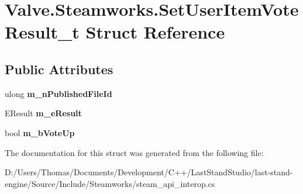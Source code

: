 \hypertarget{structValve_1_1Steamworks_1_1SetUserItemVoteResult__t}{}\section{Valve.\+Steamworks.\+Set\+User\+Item\+Vote\+Result\+\_\+t Struct Reference}
\label{structValve_1_1Steamworks_1_1SetUserItemVoteResult__t}
\subsection*{Public Attributes}
\begin{DoxyCompactItemize}
\item 
\hypertarget{structValve_1_1Steamworks_1_1SetUserItemVoteResult__t_a5e2d6cc1134bfa8d3d8f0e116e18c647}{}ulong {\bfseries m\+\_\+n\+Published\+File\+Id}\label{structValve_1_1Steamworks_1_1SetUserItemVoteResult__t_a5e2d6cc1134bfa8d3d8f0e116e18c647}

\item 
\hypertarget{structValve_1_1Steamworks_1_1SetUserItemVoteResult__t_abad4b985896aa459650985c16fc6e6d3}{}E\+Result {\bfseries m\+\_\+e\+Result}\label{structValve_1_1Steamworks_1_1SetUserItemVoteResult__t_abad4b985896aa459650985c16fc6e6d3}

\item 
\hypertarget{structValve_1_1Steamworks_1_1SetUserItemVoteResult__t_a29b73c2b809d3d37b21963f949f8f21a}{}bool {\bfseries m\+\_\+b\+Vote\+Up}\label{structValve_1_1Steamworks_1_1SetUserItemVoteResult__t_a29b73c2b809d3d37b21963f949f8f21a}

\end{DoxyCompactItemize}


The documentation for this struct was generated from the following file\+:\begin{DoxyCompactItemize}
\item 
D\+:/\+Users/\+Thomas/\+Documents/\+Development/\+C++/\+Last\+Stand\+Studio/last-\/stand-\/engine/\+Source/\+Include/\+Steamworks/steam\+\_\+api\+\_\+interop.\+cs\end{DoxyCompactItemize}
